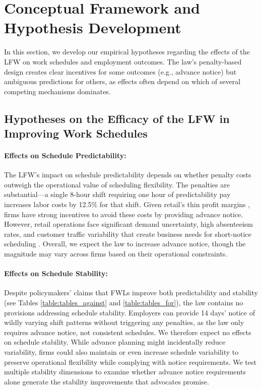 \documentclass[letterpaper,11pt,leqno]{article}
\theoremstyle{paper}
\begin{document}
\section{Conceptual Framework and Hypothesis Development} \label{sec:hyp}

In this section, we develop our empirical hypotheses regarding the effects of the LFW on work schedules and employment outcomes. The law's penalty-based design creates clear incentives for some outcomes (e.g., advance notice) but ambiguous predictions for others, as effects often depend on which of several competing mechanisms dominates.


\subsection{Hypotheses on the Efficacy of the LFW in Improving Work Schedules}

\paragraph{Effects on Schedule Predictability:}
The LFW's impact on schedule predictability depends on whether penalty costs outweigh the operational value of scheduling flexibility. The penalties are substantial—a single 8-hour shift requiring one hour of predictability pay increases labor costs by 12.5\% for that shift. Given retail's thin profit margins \citep{fisher_raman_2010}, firms have strong incentives to avoid these costs by providing advance notice. However, retail operations face significant demand uncertainty, high absenteeism rates, and customer traffic variability that create business needs for short-notice scheduling \citep{netessine_traffic,kesavan_traffic,kwon_late}. Overall, we expect the law to increase advance notice, though the magnitude may vary across firms based on their operational constraints.

\paragraph{Effects on Schedule Stability:}
Despite policymakers' claims that FWLs improve both predictability and stability (see Tables \ref{table:tables_against} and \ref{table:tables_for}), the law contains no provisions addressing schedule stability. Employers can provide 14 days' notice of wildly varying shift patterns without triggering any penalties, as the law only requires advance notice, not consistent schedules. We therefore expect no effects on schedule stability. While advance planning might incidentally reduce variability, firms could also maintain or even increase schedule variability to preserve operational flexibility while complying with notice requirements. We test multiple stability dimensions to examine whether advance notice requirements alone generate the stability improvements that advocates promise.
\end{document}
